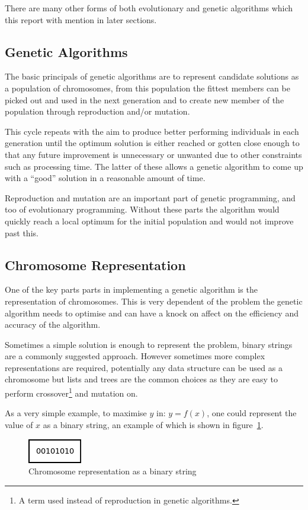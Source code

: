 \documentclass[10pt, a4paper]{article}
\begin{document}
There are many other forms of both evolutionary and genetic algorithms which
this report with mention in later sections.


\subsection{Genetic Algorithms}
The basic principals of genetic algorithms are to represent candidate solutions
as a population of chromosomes, from this population the fittest members can be
picked out and used in the next generation and to create new member of the 
population through reproduction and/or mutation.

This cycle repeats with the aim to produce better performing individuals in 
each generation until the optimum solution is either reached or gotten close
enough to that any future improvement is unnecessary or unwanted due to
other constraints such as processing time. The latter of these allows a genetic
algorithm to come up with a ``good'' solution in a reasonable amount of time.

Reproduction and mutation are an important part of genetic programming, and too
of evolutionary programming. Without these parts the algorithm would quickly 
reach a local optimum for the initial population and would not improve past 
this.

\subsection{Chromosome Representation}
One of the key parts parts in implementing a genetic algorithm is the 
representation of chromosomes. This is very dependent of the problem the 
genetic algorithm needs to optimise and can have a knock on affect on the 
efficiency and accuracy of the algorithm.

Sometimes a simple solution is enough to represent the problem, binary strings
are a commonly suggested approach. However sometimes more complex 
representations are required, potentially any data structure can be used as a
chromosome but lists and trees are the common choices as they are easy to 
perform crossover\footnote{A term used instead of reproduction in genetic 
algorithms.} and mutation on.

As a very simple example, to maximise $y$ in: $y = f(x)$, one could represent 
the value of $x$ as a binary string, an example of which is shown in 
figure~\ref{fig:chromosome}.

\begin{figure}[h]
\centering
\includegraphics[scale=0.6]{img/chromosome.png}
\caption{Chromosome representation as a binary string}\label{fig:chromosome}
\end{figure}
\end{document}
